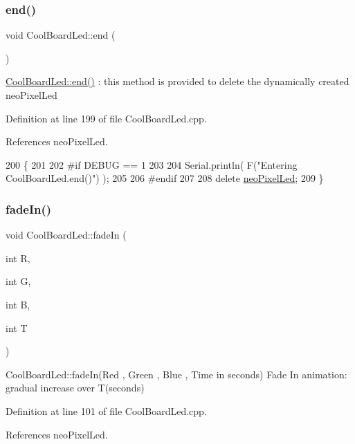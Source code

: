 \subsubsection{\texorpdfstring{end()}{end()}}
{\footnotesize\ttfamily void Cool\+Board\+Led\+::end (\begin{DoxyParamCaption}{ }\end{DoxyParamCaption})}

\hyperlink{classCoolBoardLed_a69f323359e0c9f797422f2152b5d41ef}{Cool\+Board\+Led\+::end()} \+: this method is provided to delete the dynamically created neo\+Pixel\+Led 

Definition at line 199 of file Cool\+Board\+Led.\+cpp.



References neo\+Pixel\+Led.


\begin{DoxyCode}
200 \{
201 
202 \textcolor{preprocessor}{#if DEBUG == 1 }
203     
204     Serial.println( F(\textcolor{stringliteral}{"Entering CoolBoardLed.end()"}) );
205 
206 \textcolor{preprocessor}{#endif}
207 
208     \textcolor{keyword}{delete} \hyperlink{classCoolBoardLed_ac2c13fa462a010cd9242bf297c013923}{neoPixelLed};
209 \}
\end{DoxyCode}
\mbox{\label{classCoolBoardLed_aec915442a8441c7cd45c3279d3ff8821}} 
\subsubsection{\texorpdfstring{fade\+In()}{fadeIn()}}
{\footnotesize\ttfamily void Cool\+Board\+Led\+::fade\+In (\begin{DoxyParamCaption}\item[{int}]{R,  }\item[{int}]{G,  }\item[{int}]{B,  }\item[{int}]{T }\end{DoxyParamCaption})}

Cool\+Board\+Led\+::fade\+In(\+Red , Green , Blue , Time in seconds) Fade In animation\+: gradual increase over T(seconds) 

Definition at line 101 of file Cool\+Board\+Led.\+cpp.



References neo\+Pixel\+Led.


